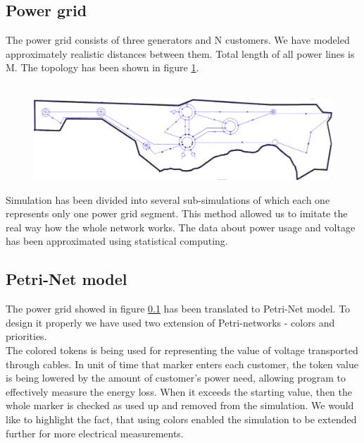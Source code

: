 \documentclass[a4paper]{article}
\begin{document}
\subsection{Power grid}
\label{sec:powerGrid}

The power grid consists of three generators and N customers. We have modeled approximately realistic distances between them. Total length of all power lines is M. The topology has been shown in figure \ref{fig:img3}.\\\\

\begin{figure}[h]
\centering
\includegraphics[scale=0.35]{schemas/img3.png}
\caption{\label{fig:img3}}
\end{figure}

Simulation has been divided into several sub-simulations of which each one represents only one power grid segment. This method allowed us to imitate the real way how the whole network works. The data about power usage and voltage has been approximated using statistical computing.


\subsection{Petri-Net model}
\label{sec:petriNetModel}

The power grid showed in figure \ref{sec:powerGrid} has been translated to Petri-Net model. To design it properly we have used two extension of Petri-networks - colors and priorities.\\


The colored tokens is being used for representing the value of voltage transported through cables. In unit of time that marker enters each customer, the token value is being lowered by the amount of customer's power need, allowing program to effectively measure the energy loss. When it exceeds the starting value, then the whole marker is checked as used up and removed from the simulation. We would like to highlight the fact, that using colors enabled the simulation to be extended further for more electrical measurements.\\
\end{document}
